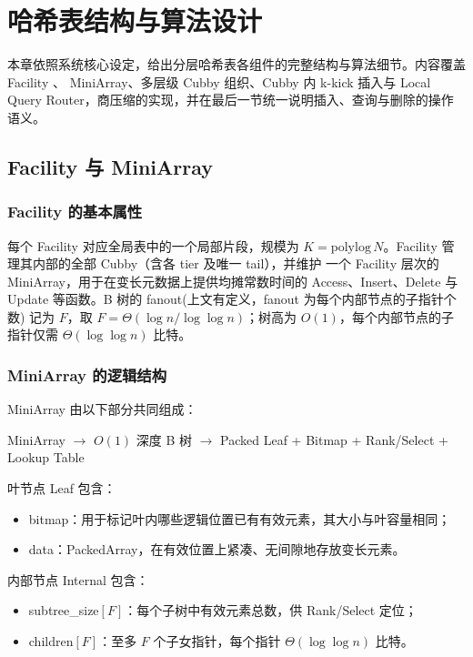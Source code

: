 \chapter{哈希表结构与算法设计}
\label{ch:system}

本章依照系统核心设定，给出分层哈希表各组件的完整结构与算法细节。内容覆盖 Facility 、 MiniArray、多层级 Cubby 组织、Cubby 内 k-kick 插入与 Local Query Router，商压缩的实现，并在最后一节统一说明插入、查询与删除的操作语义。

\section{Facility 与 MiniArray}

\subsection{Facility 的基本属性}

每个 Facility 对应全局表中的一个局部片段，规模为 \(K=\mathrm{polylog}\,N\)。Facility 管理其内部的全部 Cubby（含各 tier 及唯一 tail），并维护 一个 Facility 层次的 MiniArray，用于在变长元数据上提供均摊常数时间的 Access、Insert、Delete 与 Update 等函数。B 树的 fanout(上文有定义，fanout 为每个内部节点的子指针个数) 记为 \(F\)，取 \(F=\Theta(\log n/\log\log n)\)；树高为 \(O(1)\)，每个内部节点的子指针仅需 \(\Theta(\log\log n)\) 比特\cite{bender2022otsh,bayer1972,pagh2001}。

\subsection{MiniArray 的逻辑结构}

MiniArray 由以下部分共同组成：
\begin{center}
  \small
  MiniArray $\rightarrow$ $O(1)$ 深度 B 树 $\rightarrow$ Packed Leaf + Bitmap + Rank/Select + Lookup Table
\end{center}

叶节点 Leaf 包含：
\begin{itemize}
  \item bitmap：用于标记叶内哪些逻辑位置已有有效元素，其大小与叶容量相同；
  \item data：PackedArray，在有效位置上紧凑、无间隙地存放变长元素。
\end{itemize}

内部节点 Internal 包含：
\begin{itemize}
  \item subtree\_size$[F]$：每个子树中有效元素总数，供 Rank/Select 定位；
  \item children$[F]$：至多 \(F\) 个子女指针，每个指针 \(\Theta(\log\log n)\) 比特。
\end{itemize}

